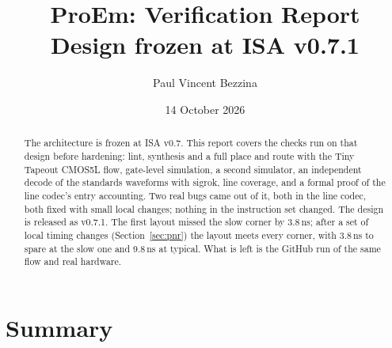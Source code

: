 \documentclass[11pt,a4paper]{article}
\title{ProEm: Verification Report\\\large Design frozen at ISA v0.7.1}
\author{Paul Vincent Bezzina}
\date{14 October 2026}
\begin{document}
\maketitle
\thispagestyle{fancy}

\begin{abstract}
The architecture is frozen at ISA v0.7. This report covers the checks run on that design before hardening: lint, synthesis and a full place and route with the Tiny Tapeout CMOS5L flow, gate-level simulation, a second simulator, an independent decode of the standards waveforms with sigrok, line coverage, and a formal proof of the line codec's entry accounting. Two real bugs came out of it, both in the line codec, both fixed with small local changes; nothing in the instruction set changed. The design is released as v0.7.1. The first layout missed the slow corner by 3.8\,ns; after a set of local timing changes (Section~\ref{sec:pnr}) the layout meets every corner, with 3.8\,ns to spare at the slow one and 9.8\,ns at typical. What is left is the GitHub run of the same flow and real hardware.
\end{abstract}

\section{Summary}
\end{document}
